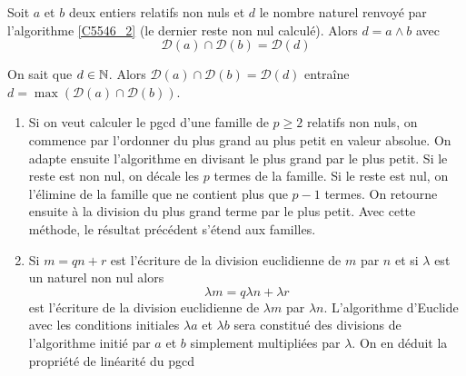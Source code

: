 \begin{propn}\label{pgcd}
  Soit $a$ et $b$ deux entiers relatifs non nuls et $d$ le nombre naturel renvoyé par l'algorithme \ref{C5546_2} (le dernier reste non nul calculé). Alors $d = a\wedge b$ avec
\begin{displaymath}
  \mathcal{D}(a)\cap \mathcal{D}(b) = \mathcal{D}(d)
\end{displaymath}
\end{propn}
\begin{demo}
  On sait que $d\in \mathbb{N}$. Alors $\mathcal{D}(a)\cap \mathcal{D}(b) = \mathcal{D}(d)$ entraîne $d = \max\left( \mathcal{D}(a)\cap \mathcal{D}(b)\right)$.
\end{demo}
\begin{rems}
\begin{enumerate}
  \item Si on veut calculer le pgcd d'une famille de $p\geq2$ relatifs non nuls, on commence par l'ordonner du plus grand au plus petit en valeur absolue. On adapte ensuite l'algorithme en divisant le plus grand par le plus petit. Si le reste est non nul, on décale les $p$ termes de la famille. Si le reste est nul, on l'élimine de la famille que ne contient plus que $p-1$ termes. On retourne ensuite à la division du plus grand terme par le plus petit. Avec cette méthode, le résultat précédent s'étend aux familles.
  \item Si $m = qn +r$ est l'écriture de la division euclidienne de $m$ par $n$ et si $\lambda$ est un naturel non nul alors 
  \begin{displaymath}
    \lambda m = q \lambda n + \lambda r
  \end{displaymath}
est l'écriture de la division euclidienne de $\lambda m$ par $\lambda n$. L'algorithme d'Euclide avec les conditions initiales $\lambda a$ et $\lambda b$ sera constitué des divisions de l'algorithme initié par $a$ et $b$ simplement multipliées par $\lambda$. On en déduit la propriété de linéarité du pgcd
\end{enumerate}
 \end{rems}
